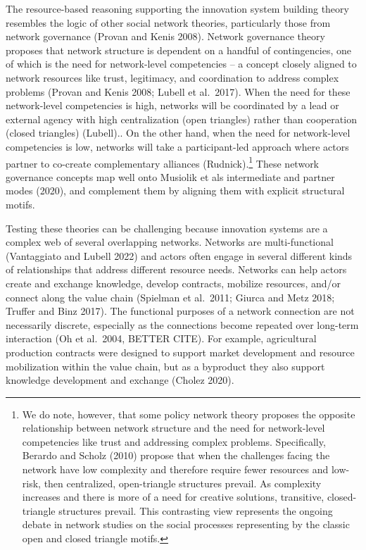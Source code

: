 \documentclass[twoside,12pt,final]{ucthesis-CA2012}
\begin{document}
\begin{ucmainmatter}
The resource-based reasoning supporting the innovation system building
theory resembles the logic of other social network theories,
particularly those from network governance (Provan and Kenis 2008).
Network governance theory proposes that network structure is dependent
on a handful of contingencies, one of which is the \textquotesingle need for
network-level competencies\textquotesingle{} -- a concept closely aligned to network
resources like trust, legitimacy, and coordination to address complex
problems (Provan and Kenis 2008; Lubell et al.~2017). When the need for
these network-level competencies is high, networks will be coordinated
by a lead or external agency with high centralization (open triangles)
rather than cooperation (closed triangles) (Lubell).. On the other hand,
when the need for network-level competencies is low, networks will take
a participant-led approach where actors partner to co-create
complementary alliances (Rudnick).\footnote{We do note, however, that some policy network theory proposes the
  opposite relationship between network structure and the need for
  network-level competencies like trust and addressing complex
  problems. Specifically, Berardo and Scholz (2010) propose that when
  the challenges facing the network have low complexity and therefore
  require fewer resources and low-risk, then centralized,
  open-triangle structures prevail. As complexity increases and there
  is more of a need for creative solutions, transitive,
  closed-triangle structures prevail. This contrasting view represents
  the ongoing debate in network studies on the social processes
  representing by the classic open and closed triangle motifs.} These network governance concepts
map well onto Musiolik et al\textquotesingle s intermediate and partner modes (2020),
and complement them by aligning them with explicit structural motifs.

Testing these theories can be challenging because innovation systems are
a complex web of several overlapping networks. Networks are
multi-functional (Vantaggiato and Lubell 2022) and actors often engage
in several different kinds of relationships that address different
resource needs. Networks can help actors create and exchange knowledge,
develop contracts, mobilize resources, and/or connect along the value
chain (Spielman et al.~2011; Giurca and Metz 2018; Truffer and Binz
2017). The functional purposes of a network connection are not
necessarily discrete, especially as the connections become repeated over
long-term interaction (Oh et al.~2004, BETTER CITE). For example,
agricultural production contracts were designed to support market
development and resource mobilization within the value chain, but as a
byproduct they also support knowledge development and exchange (Cholez
2020).


\end{ucmainmatter}
\end{document}
